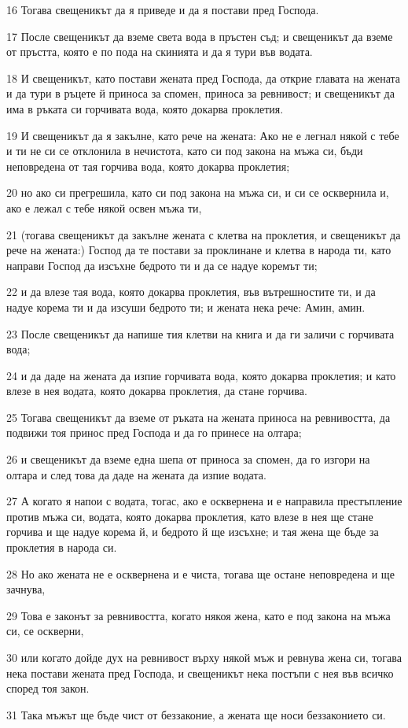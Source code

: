 \par 16 Тогава свещеникът да я приведе и да я постави пред Господа.
\par 17 После свещеникът да вземе света вода в пръстен съд; и свещеникът да вземе от пръстта, която е по пода на скинията и да я тури във водата.
\par 18 И свещеникът, като постави жената пред Господа, да открие главата на жената и да тури в ръцете й приноса за спомен, приноса за ревнивост; и свещеникът да има в ръката си горчивата вода, която докарва проклетия.
\par 19 И свещеникът да я закълне, като рече на жената: Ако не е легнал някой с тебе и ти не си се отклонила в нечистота, като си под закона на мъжа си, бъди неповредена от тая горчива вода, която докарва проклетия;
\par 20 но ако си прегрешила, като си под закона на мъжа си, и си се осквернила и, ако е лежал с тебе някой освен мъжа ти,
\par 21 (тогава свещеникът да закълне жената с клетва на проклетия, и свещеникът да рече на жената:) Господ да те постави за проклинане и клетва в народа ти, като направи Господ да изсъхне бедрото ти и да се надуе коремът ти;
\par 22 и да влезе тая вода, която докарва проклетия, във вътрешностите ти, и да надуе корема ти и да изсуши бедрото ти; и жената нека рече: Амин, амин.
\par 23 После свещеникът да напише тия клетви на книга и да ги заличи с горчивата вода;
\par 24 и да даде на жената да изпие горчивата вода, която докарва проклетия; и като влезе в нея водата, която докарва проклетия, да стане горчива.
\par 25 Тогава свещеникът да вземе от ръката на жената приноса на ревнивостта, да подвижи тоя принос пред Господа и да го принесе на олтара;
\par 26 и свещеникът да вземе една шепа от приноса за спомен, да го изгори на олтара и след това да даде на жената да изпие водата.
\par 27 А когато я напои с водата, тогас, ако е осквернена и е направила престъпление против мъжа си, водата, която докарва проклетия, като влезе в нея ще стане горчива и ще надуе корема й, и бедрото й ще изсъхне; и тая жена ще бъде за проклетия в народа си.
\par 28 Но ако жената не е осквернена и е чиста, тогава ще остане неповредена и ще зачнува,
\par 29 Това е законът за ревнивостта, когато някоя жена, като е под закона на мъжа си, се оскверни,
\par 30 или когато дойде дух на ревнивост върху някой мъж и ревнува жена си, тогава нека постави жената пред Господа, и свещеникът нека постъпи с нея във всичко според тоя закон.
\par 31 Така мъжът ще бъде чист от беззаконие, а жената ще носи беззаконието си.

